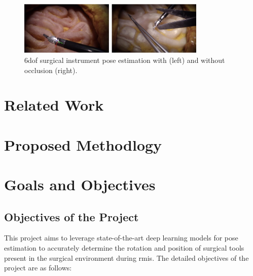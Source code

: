 \documentclass[12pt]{article}
\begin{document}
\begin{figure}[H]
            \centering
            \includegraphics[width=0.8\textwidth]{6Dof.png}
            \caption{\gls{6dof} surgical instrument pose estimation with (left) and without occlusion (right). \cite{surgripe2024}}
      \end{figure}


\section{Related Work}


\section{Proposed Methodlogy}


\section{Goals and Objectives}
\subsection{Objectives of the Project}
This project aims to leverage state-of-the-art deep learning models for pose estimation to accurately determine the rotation and position of surgical tools present in the surgical environment during \gls{rmis}. The detailed objectives of the project are as follows:
\end{document}
